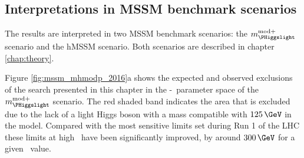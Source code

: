 \subsection{Interpretations in MSSM benchmark scenarios}
\label{sec:mssm_results_modeldep}
The results are interpreted in two MSSM benchmark scenarios: the $m_{\text{\PHiggslight}}^{\text{mod+}}$
scenario and the hMSSM scenario. Both scenarios are described in chapter \ref{chap:theory}.

Figure \ref{fig:mssm_mhmodp_2016}a shows the expected and
observed exclusions of the search presented in this chapter
in the \mA-\tanb~parameter space of the $m_{\PHiggslight}^{\text{mod+}}$ scenario. The red shaded band
indicates the area that is excluded due to the lack of a light Higgs boson with a mass compatible
with $125\,\GeV$ in the model. Compared with the most sensitive limits set during Run 1 of the \ac{LHC} these
limits at high \tanb~have been significantly improved, by around $300\,\GeV$ for a given \tanb~value.

